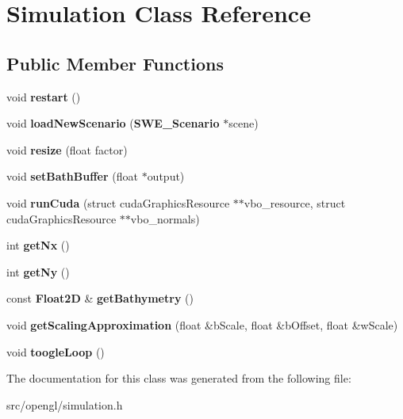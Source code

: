 \section{Simulation Class Reference}
\label{classSimulation}
\subsection*{Public Member Functions}
\begin{DoxyCompactItemize}
\item 
void {\bfseries restart} ()\label{classSimulation_a6be9990c6b2e31959254c8aa7b6df8a1}

\item 
void {\bfseries load\-New\-Scenario} ({\bf S\-W\-E\-\_\-\-Scenario} $\ast$scene)\label{classSimulation_a0d9c93f7fbb498ac6f84d22baab8bbb0}

\item 
void {\bfseries resize} (float factor)\label{classSimulation_a349cba71f66fac2a159e3517ae7327ab}

\item 
void {\bfseries set\-Bath\-Buffer} (float $\ast$output)\label{classSimulation_a3d8e72877a4c982eaead748b8f8faf36}

\item 
void {\bfseries run\-Cuda} (struct cuda\-Graphics\-Resource $\ast$$\ast$vbo\-\_\-resource, struct cuda\-Graphics\-Resource $\ast$$\ast$vbo\-\_\-normals)\label{classSimulation_ab49e788b7f797a1bebdb3f5667cc95b9}

\item 
int {\bfseries get\-Nx} ()\label{classSimulation_a3e99b3b75a733fe887f1ea60307af78e}

\item 
int {\bfseries get\-Ny} ()\label{classSimulation_a58809b28521e41ba4b853cbf49dcd5a6}

\item 
const {\bf Float2\-D} \& {\bfseries get\-Bathymetry} ()\label{classSimulation_a54ff6716f1d6d7a7627ee31062afa2c2}

\item 
void {\bfseries get\-Scaling\-Approximation} (float \&b\-Scale, float \&b\-Offset, float \&w\-Scale)\label{classSimulation_aeb1357e23e68821bb27922f3c97b04c2}

\item 
void {\bfseries toogle\-Loop} ()\label{classSimulation_a60120697b4c33d63ed3226f30683f207}

\end{DoxyCompactItemize}


The documentation for this class was generated from the following file\-:\begin{DoxyCompactItemize}
\item 
src/opengl/simulation.\-h\end{DoxyCompactItemize}
